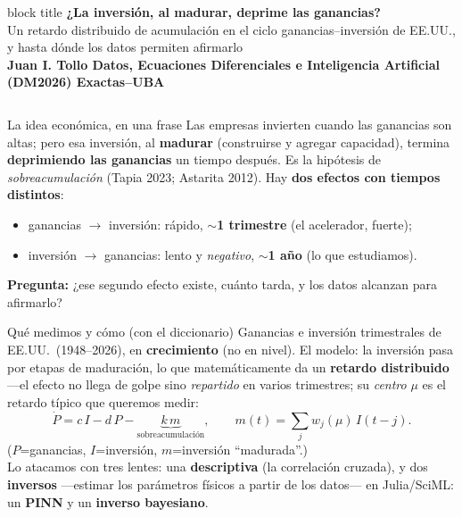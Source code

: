 \documentclass[final]{beamer}
\newcommand{\jerga}[1]{\textcolor{accent}{\textbf{#1}}}
\newlength{\colw}\setlength{\colw}{0.47\paperwidth}
\begin{document}
\begin{frame}[t]{}

\begin{beamercolorbox}[wd=\paperwidth,sep=20pt,center]{block title}
  {\veryHuge\bfseries ¿La inversión, al madurar, deprime las ganancias?}\\[10pt]
  {\Large Un retardo distribuido de acumulación en el ciclo ganancias--inversión de EE.UU.,
   y hasta dónde los datos permiten afirmarlo}\\[14pt]
  {\large\bfseries Juan I. Tollo \quad\textbar\quad
   Datos, Ecuaciones Diferenciales e Inteligencia Artificial (DM2026) \quad\textbar\quad Exactas--UBA}
\end{beamercolorbox}
\vspace{0.7cm}

\begin{columns}[t]

\begin{column}{\colw}

\begin{block}{La idea económica, en una frase}
  \large
  Las empresas invierten cuando las ganancias son altas; pero esa inversión, al \textbf{madurar}
  (construirse y agregar capacidad), termina \textbf{deprimiendo las ganancias} un tiempo después.
  Es la hipótesis de \emph{sobreacumulación} (Tapia 2023; Astarita 2012). Hay \textbf{dos efectos
  con tiempos distintos}:
  \begin{itemize}\large
    \item ganancias $\to$ inversión: rápido, \textbf{$\sim$1 trimestre} (el acelerador, fuerte);
    \item inversión $\to$ ganancias: lento y \emph{negativo}, \textbf{$\sim$1 año} (lo que estudiamos).
  \end{itemize}
  \textbf{Pregunta:} ¿ese segundo efecto existe, cuánto tarda, y los datos alcanzan para afirmarlo?
\end{block}

\begin{block}{Qué medimos y cómo (con el diccionario)}
  \large
  Ganancias e inversión trimestrales de EE.UU.\ (1948--2026), en \textbf{crecimiento} (no en
  nivel). El modelo: la inversión pasa por etapas de maduración, lo que matemáticamente da un
  \jerga{retardo distribuido} ---el efecto no llega de golpe sino \emph{repartido} en varios
  trimestres; su \emph{centro} $\mu$ es el retardo típico que queremos medir:
  \[\dot P = c\,I - d\,P - \underbrace{k\,m}_{\text{sobreacumulación}},\qquad
    m(t)=\textstyle\sum_j w_j(\mu)\,I(t-j).\]
  \footnotesize ($P$=ganancias, $I$=inversión, $m$=inversión ``madurada''.)\\[4pt]
  \large Lo atacamos con tres lentes: una \textbf{descriptiva} (la correlación cruzada), y dos
  \textbf{inversos} ---estimar los parámetros físicos a partir de los datos--- en Julia/SciML:
  un \jerga{PINN} y un \jerga{inverso bayesiano}.
\end{block}


\end{column}
\end{columns}
\end{frame}
\end{document}
